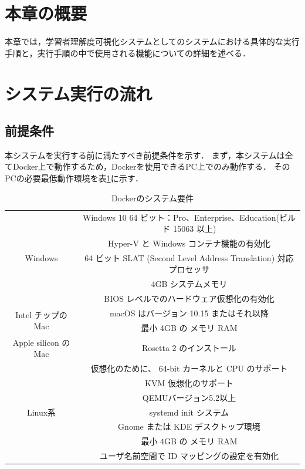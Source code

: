 \section{本章の概要}
本章では，学習者理解度可視化システムとしてのシステムにおける具体的な実行手順と，実行手順の中で使用される機能についての詳細を述べる．

\section{システム実行の流れ}
\subsection{前提条件}
本システムを実行する前に満たすべき前提条件を示す．
まず，本システムは全てDocker上で動作するため，Dockerを使用できるPC上でのみ動作する．
そのPCの必要最低動作環境を表\ref{tab:docker_env}に示す．
\newpage
\begin{table}[htb]
    \centering
    \caption{Dockerのシステム要件}
    \label{tab:docker_env}
    \begin{tabular}{|c|c|}  \hline
        \multirow{5}{*}{Windows} & Windows 10 64 ビット：Pro、Enterprise、Education(ビルド 15063 以上) \\
		              & Hyper-V と Windows コンテナ機能の有効化 \\ 
                      & 64 ビット SLAT (Second Level Address Translation) 対応プロセッサ \\ 
                      & 4GB システムメモリ \\ 
                      & BIOS レベルでのハードウェア仮想化の有効化 \\ \hline
        \multirow{2}{*}{Intel チップの Mac} & macOS はバージョン 10.15 またはそれ以降 \\
        & 最小 4GB の メモリ RAM \\ \hline
        Apple silicon の Mac & Rosetta 2 のインストール \\ \hline
        \multirow{7}{*}{Linux系} & 仮想化のために、 64-bit カーネルと CPU のサポート \\
        & KVM 仮想化のサポート \\ 
        & QEMUバージョン5.2以上 \\
        & systemd init システム \\ 
        & Gnome または KDE デスクトップ環境 \\ 
        & 最小 4GB の メモリ RAM \\
        & ユーザ名前空間で ID マッピングの設定を有効化 \\ \hline
    \end{tabular}
\end{table}

